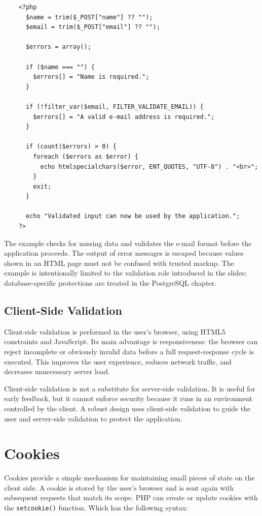 \documentclass{scrbook}
\begin{document}
	\begin{lstlisting}
	<?php
	  $name = trim($_POST["name"] ?? "");
	  $email = trim($_POST["email"] ?? "");
		
	  $errors = array();
		
	  if ($name === "") {
		$errors[] = "Name is required.";
	  }
		
	  if (!filter_var($email, FILTER_VALIDATE_EMAIL)) {
		$errors[] = "A valid e-mail address is required.";
	  }
		
	  if (count($errors) > 0) {
		foreach ($errors as $error) {
		  echo htmlspecialchars($error, ENT_QUOTES, "UTF-8") . "<br>";
		}
		exit;
	  }
		
	  echo "Validated input can now be used by the application.";
	?>
	\end{lstlisting}
	
	The example checks for missing data and validates the e-mail format before the application proceeds. The output of error messages is escaped because values shown in an HTML page must not be confused with trusted markup. The example is intentionally limited to the validation role introduced in the slides; database-specific protections are treated in the PostgreSQL chapter.
	
	\subsection{Client-Side Validation}
	
	Client-side validation is performed in the user's browser, using HTML5 constraints and JavaScript. Its main advantage is responsiveness: the browser can reject incomplete or obviously invalid data before a full request-response cycle is executed. This improves the user experience, reduces network traffic, and decreases unnecessary server load.
	
	Client-side validation is not a substitute for server-side validation. It is useful for early feedback, but it cannot enforce security because it runs in an environment controlled by the client. A robust design uses client-side validation to guide the user and server-side validation to protect the application.
	
	\section{Cookies}
	
	Cookies provide a simple mechanism for maintaining small pieces of state on the client side. A cookie is stored by the user's browser and is sent again with subsequent requests that match its scope. PHP can create or update cookies with the \texttt{setcookie()} function. Which has the following syntax:
	
\end{document}
